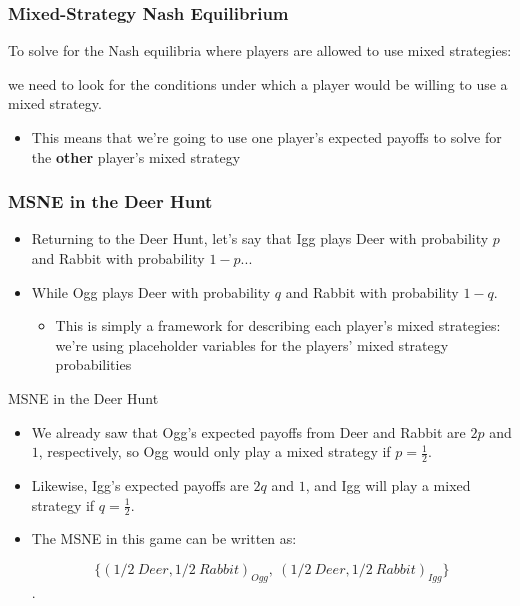 
\begin{frame}
\frametitle{Mixed-Strategy Nash Equilibrium}
	To solve for the Nash equilibria where players are allowed to use mixed strategies:

  we need to look for the conditions under which a player would be willing to use a mixed strategy.

\begin{itemize}

	\item This means that we're going to use one player's expected payoffs to solve for the \textbf{other} player's mixed strategy

\end{itemize}
\end{frame}


\begin{frame}
\frametitle{MSNE in the Deer Hunt}
\begin{itemize}
	\item Returning to the Deer Hunt, let's say that Igg plays Deer with probability $p$ and Rabbit with probability $1 - p$...
	\item While Ogg plays Deer with probability $q$ and Rabbit with probability $1 - q$.
	\begin{itemize}
		\item This is simply a framework for describing each player's mixed strategies:
    we're using placeholder variables for the players' mixed strategy probabilities
	\end{itemize}
\end{itemize}
\end{frame}


\begin{frame}{MSNE in the Deer Hunt}
  \begin{itemize}
	\item We already saw that Ogg's expected payoffs from Deer and Rabbit are $2p$ and $1$, respectively, 
    so Ogg would only play a mixed strategy if $p = \frac{1}{2}$.

	\item Likewise, Igg's expected payoffs are $2q$ and $1$, and Igg will play a mixed strategy if $q = \frac{1}{2}$.

	\item The MSNE in this game can be written as:

    $$ \{(1/2~Deer, 1/2~Rabbit)_{Ogg}, \ (1/2~Deer, 1/2~Rabbit)_{Igg}\}$$.

\end{itemize}
\end{frame}


